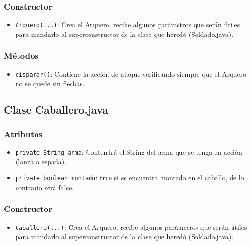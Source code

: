 \documentclass{article}
\begin{document}
\subsubsection{Constructor}
\begin{itemize}
    \item \texttt{Arquero(...)}: Crea el Arquero, recibe algunos parámetros que serán útiles para mandarlo al superconstructor de la clase que heredó (Soldado.java).
\end{itemize}

\subsubsection{Métodos}
\begin{itemize}
        \item \texttt{disparar()}: Contiene la acción de ataque verificando siempre que el Arquero no se quede sin flechas.
\end{itemize}




\newpage %

\subsection{Clase Caballero.java}
\subsubsection{Atributos}
\begin{itemize}
    \item \texttt{private String arma}: Contendrá el String del arma que se tenga en acción (lanza o espada).
    \item \texttt{private boolean montado}: true si se encuentra montado en el caballo, de lo contrario será false.
\end{itemize}



\subsubsection{Constructor}
\begin{itemize}
    \item \texttt{Caballero(...)}: Crea el Arquero, recibe algunos parámetros que serán útiles para mandarlo al superconstructor de la clase que heredó (Soldado.java).
\end{itemize}

\end{document}
